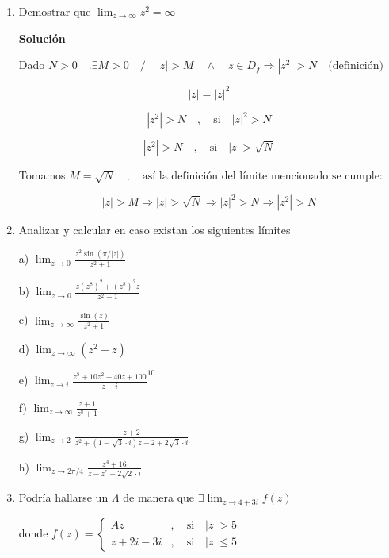\documentclass[a4paper,12pt]{article}
\begin{document}
\begin{enumerate}
    \[ |z - 0| > M \Rightarrow \left| \frac{z + 1}{z^2} \right| < \epsilon \text{ (fácil de comprobar) } \]
    
    luego hemos demostrado que \[ \lim_{z \rightarrow \infty} \frac{z + 1}{z} = 0 \]

    \item Demostrar que \(\lim_{z \rightarrow \infty} z^2 = \infty\)

    \textbf{Solución}
    
    Dado \(N > 0 \quad . \exists M > 0 \quad / \quad |z| > M \quad \wedge \quad z \in D_f \Rightarrow |z^2| > N \quad \text{(definición)} \)
    
    \[ |z| = |z|^2 \]
    
    \[ |z^2| > N \quad, \quad \text{si} \quad |z|^2 > N \]
    
    \[ |z^2| > N \quad, \quad \text{si} \quad |z| > \sqrt{N} \]
    
    Tomamos \(M = \sqrt{N} \quad , \quad \text{así la definición del límite mencionado se cumple:} \)
    
    \[ |z| > M \Rightarrow |z| > \sqrt{N} \Rightarrow |z|^2 > N \Rightarrow |z^2| > N \]
    
    \item Analizar y calcular en caso existan los siguientes límites
    
    a) \(\lim_{z \rightarrow 0} \frac{z^2 \sin(\pi / |z|)}{z^2 + 1}\)
    
    b) \(\lim_{z \rightarrow 0} \frac{z(z^8)^2 + (z^8)^2 z}{z^2 + 1}\)
    
    c) \(\lim_{z \rightarrow \infty} \frac{\sin(z)}{z^2 + 1}\)
    
    d) \(\lim_{z \rightarrow \infty} (z^2 - z)\)
    
    e) \(\lim_{z \rightarrow i} \frac{z^8 + 10z^2 + 40z + 100}{z - i}^{10}\)
    
    f) \(\lim_{z \rightarrow \infty} \frac{z + 1}{z^8 + 1}\)
    
    g) \(\lim_{z \rightarrow 2} \frac{z + 2}{z^2 + (1 - \sqrt{3} \cdot i)z - 2 + 2\sqrt{3} \cdot i}\)
    
    h) \(\lim_{z \rightarrow 2 \pi / 4} \frac{z^4 + 16}{z - z^* - 2\sqrt{2} \cdot i}\)
    
    \item Podría hallarse un \(\Lambda\) de manera que \(\exists \lim_{z \rightarrow 4 + 3i} f(z)\)
    
    donde \(f(z) = \left\{ \begin{array}{cl}
    Az & , \quad \text{si} \quad |z| > 5 \\
    z + 2i - 3i & , \quad \text{si} \quad |z| \leq 5
    \end{array} \right.\)
    

\end{enumerate}
\end{document}
